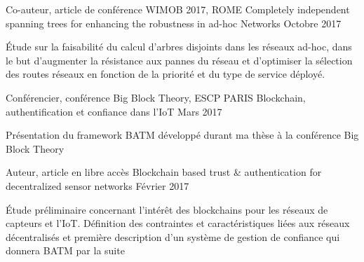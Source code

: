 

\begin{cventries}

  \cventry
    {Co-auteur, article de conférence WIMOB 2017, ROME} %
    {Completely independent spanning trees for enhancing the robustness in ad-hoc Networks} %
    {} %
    {Octobre 2017} %
    {
      \begin{cvitems} %
        \item {\'Etude sur la faisabilité du calcul d'arbres disjoints dans les réseaux ad-hoc, dans le but d'augmenter la résistance aux pannes du réseau et d'optimiser la sélection des routes réseaux en fonction de la priorité et du type de service déployé.}
      \end{cvitems}
    }

  \cventry
    {Conférencier, conférence Big Block Theory, ESCP PARIS} %
    {Blockchain, authentification et confiance dans l'IoT}
    {} %
    {Mars 2017} %
    {
      \begin{cvitems} %
      \item {Présentation du framework BATM développé durant ma thèse à la conférence Big Block Theory}
      \end{cvitems}
    }

  \cventry
    {Auteur, article en libre accès} %
    {Blockchain based trust \& authentication for decentralized sensor networks} %
    {} %
    {Février 2017} %
    {
      \begin{cvitems} %
        \item {\'Etude préliminaire concernant l'intérêt des blockchains pour les réseaux de capteurs et l'IoT. Définition des contraintes et caractéristiques liées aux réseaux décentralisés et première description d'un système de gestion de confiance qui donnera BATM par la suite}
      \end{cvitems}
    }


\end{cventries}
